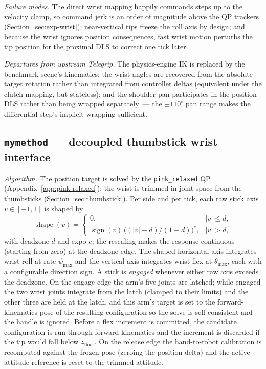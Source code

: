 \emph{Failure modes.} The direct wrist mapping happily commands steps up
to the velocity clamp, so command jerk is an order of magnitude above
the QP trackers (Section~\ref{sec:exp-wrist}); near-vertical tips freeze
the roll axis by design; and because the wrist ignores position
consequences, fast wrist motion perturbs the tip position for the
proximal DLS to correct one tick later.

\emph{Departures from upstream Telegrip.} The physics-engine IK is
replaced by the benchmark scene's kinematics; the wrist angles are
recovered from the absolute target rotation rather than integrated from
controller deltas (equivalent under the clutch mapping, but stateless);
and the shoulder pan participates in the position DLS rather than being
wrapped separately~--- the \(\pm110^\circ\) pan range makes the
differential step's implicit wrapping sufficient.

\subsection{\texttt{mymethod} — decoupled thumbstick wrist interface}
\label{app:mymethod}

\emph{Algorithm.} The position target is solved by the
\texttt{pink\_relaxed} QP (Appendix~\ref{app:pink-relaxed}); the wrist is
trimmed in joint space from the thumbsticks (Section~\ref{sec:thumbstick}).
Per side and per tick, each raw stick axis \(v\in[-1,1]\) is shaped by
\[
  \operatorname{shape}(v) =
  \begin{cases}
    0, & \lvert v\rvert \le d,\\[2pt]
    \operatorname{sign}(v)\,
    \bigl((\lvert v\rvert - d)/(1-d)\bigr)^{e}, & \lvert v\rvert > d,
  \end{cases}
\]
with deadzone \(d\) and expo \(e\); the rescaling makes the response
continuous (starting from zero) at the deadzone edge. The shaped
horizontal axis integrates wrist roll at rate \(\dot\psi_{\max}\) and the
vertical axis integrates wrist flex at \(\dot\theta_{\max}\), each with a
configurable direction sign. A stick is \emph{engaged} whenever either
raw axis exceeds the deadzone. On the engage edge the arm's five joints
are latched; while engaged the two wrist joints integrate from the latch
(clamped to their limits) and the other three are held at the latch, and
this arm's target is set to the forward-kinematics pose of the resulting
configuration so the solve is self-consistent and the handle is ignored.
Before a flex increment is committed, the candidate configuration is run
through forward kinematics and the increment is discarded if the tip
would fall below \(z_{\mathrm{floor}}\). On the release edge the
hand-to-robot calibration is recomputed against the frozen pose (zeroing
the position delta) and the active attitude reference is reset to the
trimmed attitude.

